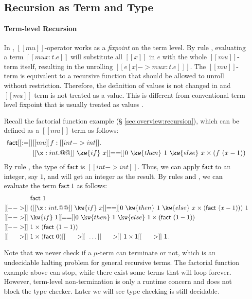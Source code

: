 \subsection{Recursion as Term and Type}
\paragraph{Term-level Recursion}

In \name, $[[mu]]$-operator works as a \emph{fixpoint} on the term
level. By rule , evaluating a term $[[mu x:t.e]]$ will
substitute all $[[x]]$ in $e$ with the whole $[[mu]]$-term itself,
resulting in the unrolling $[[e [x |-> mu x:t.e] ]]$. The
$[[mu]]$-term is equivalent to a recursive function that should be
allowed to unroll without restriction. Therefore, the definition of
values is not changed in \name and $[[mu]]$-term is not treated as a
value. This is different from conventional term-level fixpoint that is
usually treated as values \cite{zombie:popl14}.

Recall the factorial function example (\S
\ref{sec:overview:recursion}), which can be defined as a $[[mu]]$-term
as follows:
\begin{align*}
    \mathsf{fact} [[:=]] &[[mu]] f : [[int -> int]] . \\ &[[\x : int
        . @@]]~\kw{if}~x [[==]]0~\kw{then}~1~\kw{else}~x \times (f~(x
    - 1))
\end{align*}
By rule , the type of $\mathsf{fact}$ is $[[int ->
    int]]$. Thus, we can apply $\mathsf{fact}$ to an integer, say $1$, and
will get an integer as the result.  By rules  and
, we can evaluate the term $\mathsf{fact}~1$ as follows:
\begin{align*}
    &\mathsf{fact}~1 \\ [[-->]]~& ([[\x : int . @@]]~\kw{if}~x
  [[==]]0~\kw{then}~1~\kw{else}~x \times (\mathsf{fact}~(x - 1)))~1
  \\ [[-->]]~ & \kw{if}~1 [[==]]0~\kw{then}~1~\kw{else}~1 \times
  (\mathsf{fact}~(1 - 1)) \\ [[-->]]~& 1 \times (\mathsf{fact}~(1-1))
  \\ [[-->]]~& 1 \times (\mathsf{fact}~0) [[-->]]~ \dots [[-->]]~ 1 \times
  1 [[-->]]~ 1.
\end{align*}

Note that we never check if a $\mu$-term can terminate or not, which
is an undecidable halting problem for general recursive terms. The
factorial function example above can stop, while there exist some
terms that will loop forever. However, term-level non-termination is
only a runtime concern and does not block the type checker. Later we
will see type checking \name is still decidable.

